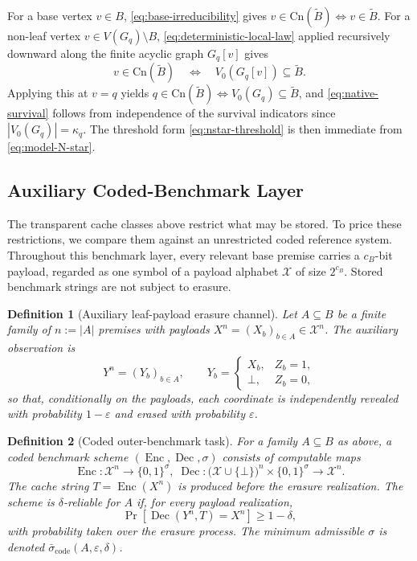\documentclass[journal]{IEEEtran}
\makeatletter
\newcommand{\Cn}{\text{Cn}}
\newtheorem{definition}{Definition}[section]
\numberwithin{equation}{section}
\renewenvironment{proof}[1][\proofname]{\par
  \pushQED{\qed}%
  \normalfont \topsep6\p@\@plus6\p@\relax
  \trivlist
  \item[\hskip\labelsep
        \itshape
    #1\@addpunct{.}]\ignorespaces
}{%
  \popQED\endtrivlist\@endpefalse
}
\DeclareMathOperator{\Enc}{Enc}
\DeclareMathOperator{\Dec}{Dec}
\makeatother
\begin{document}
\begin{proof}
For a base vertex \(v\in B\), \eqref{eq:base-irreducibility} gives
\(v\in\Cn(\widetilde B)\Leftrightarrow v\in\widetilde B\).
For a non-leaf vertex \(v\in V(G_q)\setminus B\),
\eqref{eq:deterministic-local-law} applied recursively downward along the
finite acyclic graph \(G_q[v]\) gives
\[
  v\in\Cn(\widetilde B)
  \quad\Longleftrightarrow\quad
  V_0(G_q[v])\subseteq\widetilde B.
\]
Applying this at \(v=q\) yields
\(q\in\Cn(\widetilde B)\Leftrightarrow V_0(G_q)\subseteq\widetilde B\), and
\eqref{eq:native-survival} follows from independence of the survival
indicators since \(|V_0(G_q)|=\kappa_q\).  The threshold form
\eqref{eq:nstar-threshold} is then immediate from \eqref{eq:model-N-star}.
\end{proof}

\subsection{Auxiliary Coded-Benchmark Layer}
\label{subsec:coded-benchmark-layer}

The transparent cache classes above restrict what may be stored.  To price
these restrictions, we compare them against an unrestricted coded reference
system.  Throughout this benchmark layer, every relevant base
premise carries a \(c_B\)-bit payload, regarded as one symbol of a payload
alphabet \(\mathcal X\) of size \(2^{c_B}\).  Stored benchmark strings are
not subject to erasure.

\begin{definition}[Auxiliary leaf-payload erasure channel]
\label{def:leaf-payload-channel}
Let \(A\subseteq B\) be a finite family of \(n:=|A|\) premises with payloads
\(X^n=(X_b)_{b\in A}\in\mathcal X^n\).  The auxiliary observation is
\[
  Y^n=(Y_b)_{b\in A},
  \qquad
  Y_b=
  \begin{cases}
    X_b, & Z_b=1,\\
    \bot, & Z_b=0,
  \end{cases}
\]
so that, conditionally on the payloads, each coordinate is independently
revealed with probability \(1-\varepsilon\) and erased with probability
\(\varepsilon\).
\end{definition}

\begin{definition}[Coded outer-benchmark task]
\label{def:coded-benchmark-task}
For a family \(A\subseteq B\) as above, a \emph{coded benchmark scheme}
\((\Enc,\Dec,\sigma)\) consists of computable maps
\[
  \Enc:\mathcal X^{n}\longrightarrow\{0,1\}^{\sigma},
  \;
  \Dec:\bigl(\mathcal X\cup\{\bot\}\bigr)^{n}\times\{0,1\}^{\sigma}
  \longrightarrow\mathcal X^{n}.
\]
The cache string \(T=\Enc(X^{n})\) is produced before the erasure realization.
The scheme is \(\delta\)-reliable for \(A\) if, for every payload realization,
\[
  \Pr\!\left[\Dec(Y^{n},T)=X^{n}\right]\ge 1-\delta,
\]
with probability taken over the erasure process.  The minimum admissible
\(\sigma\) is denoted \(\bar\sigma_{\mathrm{code}}(A,\varepsilon,\delta)\).
\end{definition}
\end{document}
